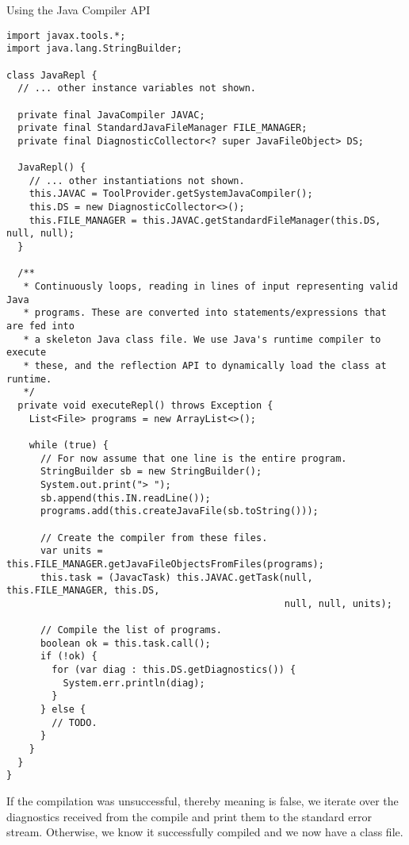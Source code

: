 \begin{cl}[]{Using the Java Compiler API}
\begin{lstlisting}[language=MyJava]
import javax.tools.*;
import java.lang.StringBuilder;

class JavaRepl {
  // ... other instance variables not shown.

  private final JavaCompiler JAVAC;
  private final StandardJavaFileManager FILE_MANAGER;
  private final DiagnosticCollector<? super JavaFileObject> DS;

  JavaRepl() {
    // ... other instantiations not shown.
    this.JAVAC = ToolProvider.getSystemJavaCompiler();
    this.DS = new DiagnosticCollector<>();
    this.FILE_MANAGER = this.JAVAC.getStandardFileManager(this.DS, null, null);
  }

  /**
   * Continuously loops, reading in lines of input representing valid Java
   * programs. These are converted into statements/expressions that are fed into
   * a skeleton Java class file. We use Java's runtime compiler to execute
   * these, and the reflection API to dynamically load the class at runtime.
   */
  private void executeRepl() throws Exception {
    List<File> programs = new ArrayList<>();

    while (true) {
      // For now assume that one line is the entire program.
      StringBuilder sb = new StringBuilder();
      System.out.print("> ");
      sb.append(this.IN.readLine());
      programs.add(this.createJavaFile(sb.toString()));

      // Create the compiler from these files.
      var units = this.FILE_MANAGER.getJavaFileObjectsFromFiles(programs);
      this.task = (JavacTask) this.JAVAC.getTask(null, this.FILE_MANAGER, this.DS,
                                                 null, null, units);

      // Compile the list of programs.
      boolean ok = this.task.call();
      if (!ok) {
        for (var diag : this.DS.getDiagnostics()) {
          System.err.println(diag);
        }
      } else {
        // TODO.
      }
    }
  }
}
\end{lstlisting}
\end{cl}

If the compilation was unsuccessful, thereby meaning  is false, we iterate over the diagnostics received from the compile and print them to the standard error stream. Otherwise, we know it successfully compiled and we now have a class file.

